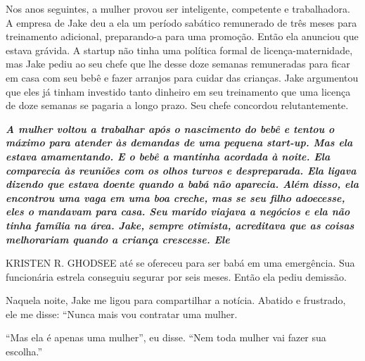  \par 
Nos anos seguintes, a mulher provou ser inteligente, competente e trabalhadora. A empresa de Jake deu a ela um período sabático remunerado de três meses para treinamento adicional, preparando-a para uma promoção. Então ela anunciou que estava grávida. A startup não tinha uma política formal de licença-maternidade, mas Jake pediu ao seu chefe que lhe desse doze semanas remuneradas para ficar em casa com seu bebê e fazer arranjos para cuidar das crianças. Jake argumentou que eles já tinham investido tanto dinheiro em seu treinamento que uma licença de doze semanas se pagaria a longo prazo. Seu chefe concordou relutantemente.
 \par 
\textit\textbf{ {A mulher voltou a trabalhar após o nascimento do bebê e tentou o máximo para atender às demandas de uma pequena start-up. Mas ela estava amamentando. E o bebê a mantinha acordada à noite. Ela comparecia às reuniões com os olhos turvos e despreparada. Ela ligava dizendo que estava doente quando a babá não aparecia. Além disso, ela encontrou uma vaga em uma boa creche, mas se seu filho adoecesse, eles o mandavam para casa. Seu marido viajava a negócios e ela não tinha família na área. Jake, sempre otimista, acreditava que as coisas melhorariam quando a criança crescesse. Ele} }
 \par 
KRISTEN R. GHODSEE até se ofereceu para ser babá em uma emergência. Sua funcionária estrela conseguiu segurar por seis meses. Então ela pediu demissão.
 \par 
Naquela noite, Jake me ligou para compartilhar a notícia. Abatido e frustrado, ele me disse: “Nunca mais vou contratar uma mulher.
 \par 
“Mas ela é apenas uma mulher”, eu disse. “Nem toda mulher vai fazer sua escolha.”
 \par 

